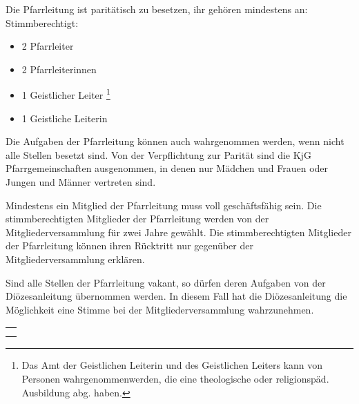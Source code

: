 \documentclass[12pt]{report}
\newcommand{\footnoteremember}[2]{
  \footnote{#2}
  \newcounter{#1}
  \setcounter{#1}{\value{footnote}}
}
\newcommand{\footnoterecall}[1]{%
  \footnotemark[\value{#1}]
}
\begin{document}
\begin{flushleft}
Die Pfarrleitung ist paritätisch zu besetzen, ihr gehören mindestens an:
Stimmberechtigt:
\begin{itemize}
  \item 2 Pfarrleiter
  \item 2 Pfarrleiterinnen
  \item 1 Geistlicher Leiter \footnoteremember{Berechtigung Geist alt}{
    Das Amt der Geistlichen Leiterin und des Geistlichen Leiters kann von Personen wahrgenommenwerden,
    die eine theologische oder religionspäd. Ausbildung abg. haben.
  }
  \item 1 Geistliche Leiterin \footnoterecall{Berechtigung Geist alt}
\end{itemize}
Die Aufgaben der Pfarrleitung können auch wahrgenommen werden, wenn nicht alle Stellen besetzt sind.
Von der Verpflichtung zur Parität sind die KjG Pfarrgemeinschaften ausgenommen, in
denen nur Mädchen und Frauen oder Jungen und Männer vertreten sind.

Mindestens ein Mitglied der Pfarrleitung muss voll geschäftsfähig sein.
Die stimmberechtigten Mitglieder der Pfarrleitung werden von der Mitgliederversammlung für
zwei Jahre gewählt. Die stimmberechtigten Mitglieder der Pfarrleitung können ihren Rücktritt nur
gegenüber der Mitgliederversammlung erklären.

Sind alle Stellen der Pfarrleitung vakant, so dürfen deren Aufgaben von der
Diözesanleitung übernommen werden. In diesem Fall hat die Diözesanleitung die Möglichkeit eine
Stimme bei der Mitgliederversammlung wahrzunehmen.


\begin{table}[H]
 \begin{tabular}{|l|}
  \hline
  \rowcolor[HTML]{9AFF99} 
  \rule[-1ex]{0pt}{4ex}
  \begin{minipage}[t]{\textwidth}
   \textbf{Änderung:\\}  
    \end{minipage}
  \\ \hline
 \end{tabular}
\end{table}


\end{flushleft}
\end{document}

